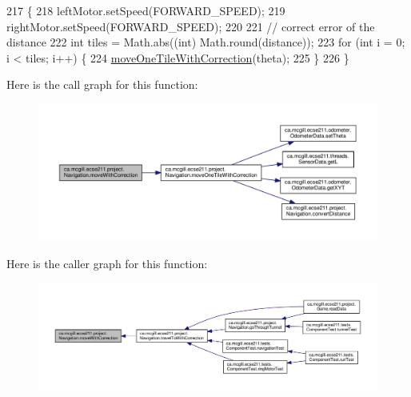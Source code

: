\begin{DoxyCode}
217                                                                              \{
218     leftMotor.setSpeed(FORWARD\_SPEED);
219     rightMotor.setSpeed(FORWARD\_SPEED);
220 
221     \textcolor{comment}{// correct error of the distance}
222     \textcolor{keywordtype}{int} tiles = Math.abs((\textcolor{keywordtype}{int}) Math.round(distance));
223     \textcolor{keywordflow}{for} (\textcolor{keywordtype}{int} i = 0; i < tiles; i++) \{
224       \hyperlink{classca_1_1mcgill_1_1ecse211_1_1project_1_1_navigation_afbe677941e2bd44e35452e1eff508ae9}{moveOneTileWithCorrection}(theta);
225     \}
226   \}
\end{DoxyCode}
Here is the call graph for this function\+:\nopagebreak
\begin{figure}[H]
\begin{center}
\leavevmode
\includegraphics[width=350pt]{classca_1_1mcgill_1_1ecse211_1_1project_1_1_navigation_a48eeb9ae2da23664421e8da5642054c7_cgraph}
\end{center}
\end{figure}
Here is the caller graph for this function\+:\nopagebreak
\begin{figure}[H]
\begin{center}
\leavevmode
\includegraphics[width=350pt]{classca_1_1mcgill_1_1ecse211_1_1project_1_1_navigation_a48eeb9ae2da23664421e8da5642054c7_icgraph}
\end{center}
\end{figure}
\mbox{\label{classca_1_1mcgill_1_1ecse211_1_1project_1_1_navigation_a1a808e665b8dd5b8e79b0580724d239c}} 
